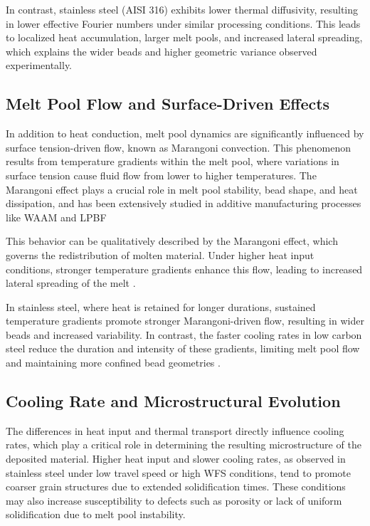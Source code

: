 \documentclass[conference]{IEEEtran}
\begin{document}
In contrast, stainless steel (AISI 316) exhibits lower thermal diffusivity, resulting in lower effective Fourier numbers under similar processing conditions. This leads to localized heat accumulation, larger melt pools, and increased lateral spreading, which explains the wider beads and higher geometric variance observed experimentally.

\subsection{Melt Pool Flow and Surface-Driven Effects}

In addition to heat conduction, melt pool dynamics are significantly influenced by surface tension-driven flow, known as Marangoni convection. This phenomenon results from temperature gradients within the melt pool, where variations in surface tension cause fluid flow from lower to higher temperatures. The Marangoni effect plays a crucial role in melt pool stability, bead shape, and heat dissipation, and has been extensively studied in additive manufacturing processes like WAAM and LPBF \cite{fouad2025, chen2023waam_mech}

This behavior can be qualitatively described by the Marangoni effect, which governs the redistribution of molten material. Under higher heat input conditions, stronger temperature gradients enhance this flow, leading to increased lateral spreading of the melt  \cite{chen2023waam_mech,debroy2018}.

In stainless steel, where heat is retained for longer durations, sustained temperature gradients promote stronger Marangoni-driven flow, resulting in wider beads and increased variability. In contrast, the faster cooling rates in low carbon steel reduce the duration and intensity of these gradients, limiting melt pool flow and maintaining more confined bead geometries \cite{fouad2025,chen2023waam_mech,debroy2018,gao2026}.

\subsection{Cooling Rate and Microstructural Evolution}

The differences in heat input and thermal transport directly influence cooling rates, which play a critical role in determining the resulting microstructure of the deposited material. Higher heat input and slower cooling rates, as observed in stainless steel under low travel speed or high WFS conditions, tend to promote coarser grain structures due to extended solidification times. These conditions may also increase susceptibility to defects such as porosity or lack of uniform solidification due to melt pool instability.
\end{document}
